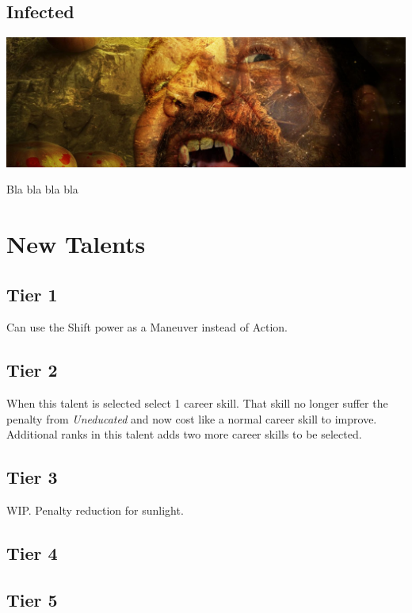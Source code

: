 \documentclass{book}
\begin{document}
\section{Infected}
\begin{center}
	\includegraphics[width=1\linewidth]{images/piqsels.com-id-znuch}
\end{center}
\begin{multicols}{2}
	
	Bla bla bla bla
	
\end{multicols}



\chapter{New Talents}
\begin{multicols}{2}
\section{Tier 1}
 Can use the Shift power as a Maneuver instead of Action.



\section{Tier 2}

 When this talent is selected select 1 career skill. That skill no longer suffer the penalty from \textit{Uneducated} and now cost like a normal career skill to improve. Additional ranks in this talent adds two more career skills to be selected.

\section{Tier 3}
 WIP. Penalty reduction for sunlight.

\section{Tier 4}

\section{Tier 5}


\end{multicols}
\end{document}
